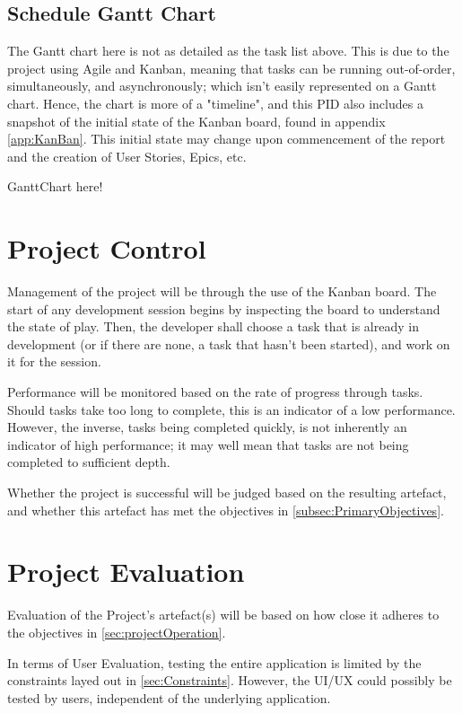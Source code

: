 \documentclass[11pt, a4paper, notitlepage]{report}
\begin{document}
\subsection{Schedule Gantt Chart}\label{subsec:schedGanttCt}
The Gantt chart here is not as detailed as the task list above. This is due to 
the project using Agile and Kanban, meaning that tasks can be running 
out-of-order, simultaneously, and asynchronously; which isn't easily 
represented on a Gantt chart. Hence, the chart is more of a "timeline", and 
this PID also includes a snapshot of the initial state of the Kanban board, 
found in appendix \ref{app:KanBan}. This initial state may change upon 
commencement of the report and the creation of User Stories, Epics, etc.
\begin{landscape}
    GanttChart here!
\end{landscape}

\section{Project Control}
Management of the project will be through the use of the Kanban board. The 
start of any development session begins by inspecting the board to understand 
the state of play. Then, the developer shall choose a task that is already in 
development (or if there are none, a task that hasn't been started), and work 
on it for the session.

Performance will be monitored based on the rate of progress through tasks. 
Should tasks take too long to complete, this is an indicator of a low 
performance. However, the inverse, tasks being completed quickly, is not 
inherently an indicator of high performance; it may well mean that tasks are 
not being completed to sufficient depth.

Whether the project is successful will be judged based on the resulting 
artefact, and whether this artefact has met the objectives in 
\ref{subsec:PrimaryObjectives}.

\section{Project Evaluation}
Evaluation of the Project's artefact(s) will be based on how close it adheres 
to the objectives in \ref{sec:projectOperation}.

In terms of User Evaluation, testing the entire application is limited by the 
constraints layed out in \ref{sec:Constraints}. However, the UI/UX could 
possibly be tested by users, independent of the underlying application.
\end{document}

